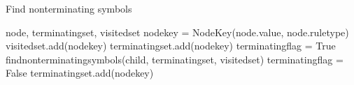 \begin{algorithm}[H]
\caption{Find nonterminating symbols}
\begin{algorithmic}[1] 
\Require node, terminating\textunderscore set, visited\textunderscore set
\State node\textunderscore key = Node\textunderscore Key(node.value, node.rule\textunderscore type)
	\State visited\textunderscore set.add(node\textunderscore key)
			\State terminating\textunderscore set.add(node\textunderscore key)
		\Else
			\State terminating\textunderscore flag = True
				\State find\textunderscore non\textunderscore terminating\textunderscore symbols(child, terminating\textunderscore set, visited\textunderscore set)		
					\State terminating\textunderscore flag = False
				\EndIf
			\EndFor
				\State terminating\textunderscore set.add(node\textunderscore key)
			\EndIf
		\EndIf
	\EndFor
\EndIf
\end{algorithmic}
\label{alg:find_non_terminating_symbols}
\end{algorithm}


